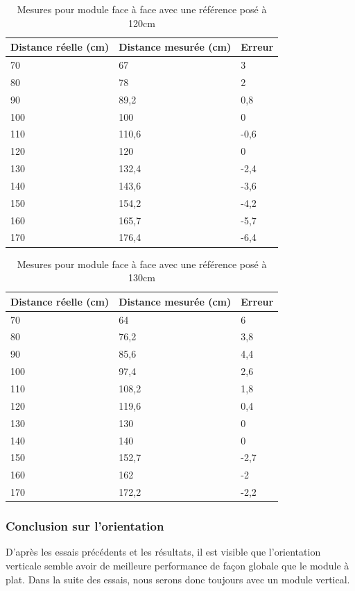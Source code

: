 \documentclass[11pt,a4paper]{article}
\begin{document}
\begin{table}[H]
    \centering
    \begin{tabular}{|l|l|l|}
    \hline
        Distance réelle (cm) & Distance mesurée (cm) & Erreur  \\ \hline
        70 & 67 & 3 \\ \hline
        80 & 78 & 2 \\ \hline
        90 & 89,2 & 0,8 \\ \hline
        100 & 100 & 0 \\ \hline
        110 & 110,6 & -0,6 \\ \hline
        120 & 120 & 0 \\ \hline
        130 & 132,4 & -2,4 \\ \hline
        140 & 143,6 & -3,6 \\ \hline
        150 & 154,2 & -4,2 \\ \hline
        160 & 165,7 & -5,7 \\ \hline
        170 & 176,4 & -6,4 \\ \hline
    \end{tabular}
    \caption{Mesures pour module face à face avec une référence posé à 120cm}
\end{table}

\begin{table}[H]
    \centering
    \begin{tabular}{|l|l|l|}
    \hline
        Distance réelle (cm) & Distance mesurée (cm) & Erreur  \\ \hline
        70 & 64 & 6 \\ \hline
        80 & 76,2 & 3,8 \\ \hline
        90 & 85,6 & 4,4 \\ \hline
        100 & 97,4 & 2,6 \\ \hline
        110 & 108,2 & 1,8 \\ \hline
        120 & 119,6 & 0,4 \\ \hline
        130 & 130 & 0 \\ \hline
        140 & 140 & 0 \\ \hline
        150 & 152,7 & -2,7 \\ \hline
        160 & 162 & -2 \\ \hline
        170 & 172,2 & -2,2 \\ \hline
    \end{tabular}
    \caption{Mesures pour module face à face avec une référence posé à 130cm}
\end{table}
\subsubsection{Conclusion sur l'orientation}
D'après les essais précédents et les résultats, il est visible que l'orientation verticale semble avoir de meilleure performance de façon globale que le module à plat. 
Dans la suite des essais, nous serons donc toujours avec un module vertical.
\end{document}
